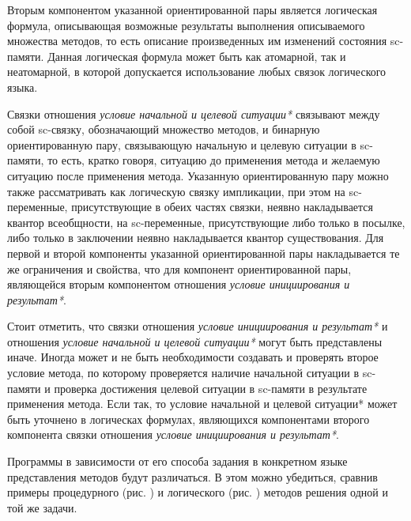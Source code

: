 Вторым компонентом указанной ориентированной пары является логическая формула, описывающая возможные результаты выполнения описываемого множества методов, то есть описание произведенных им изменений состояния sc-памяти. Данная логическая формула может быть как атомарной, так и неатомарной, в которой допускается использование любых связок логического языка.

Связки отношения \textit{условие начальной и целевой ситуации*} связывают между собой sc-связку, обозначающий множество методов, и бинарную ориентированную пару, связывающую начальную и целевую ситуации в sc-памяти, то есть, кратко говоря, ситуацию до применения метода и желаемую ситуацию после применения метода. Указанную ориентированную пару можно также рассматривать как логическую связку импликации, при этом на sc-переменные, присутствующие в обеих частях связки, неявно накладывается квантор всеобщности, на sc-переменные, присутствующие либо только в посылке, либо только в заключении неявно накладывается квантор существования. Для первой и второй компоненты указанной ориентированной пары накладывается те же ограничения и свойства, что для компонент ориентированной пары, являющейся вторым компонентом отношения \textit{условие инициирования и результат*}.

Стоит отметить, что связки отношения \textit{условие инициирования и результат*} и отношения \textit{условие начальной и целевой ситуации*} могут быть представлены иначе. Иногда может и не быть необходимости создавать и проверять второе условие метода, по которому проверяется наличие начальной ситуации в sc-памяти и проверка достижения целевой ситуации в sc-памяти в результате применения метода. Если так, то условие начальной и целевой ситуации* может быть уточнено в логическах формулах, являющихся компонентами второго компонента связки отношения \textit{условие инициирования и результат*}.

Программы в зависимости от его способа задания в конкретном языке представления методов будут различаться. В этом можно убедиться, сравнив примеры процедурного (рис. ) и логического (рис. ) методов решения одной и той же задачи.

